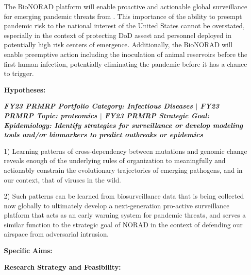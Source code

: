 \documentclass[onecolumn, compsoc,12pt]{IEEEtran}
\begin{document}
The BioNORAD platform will enable proactive and actionable global surveillance for emerging pandemic threats from \infl. This importance of the ability to preempt pandemic risk to the national interest of the United States cannot be overstated, especially in the context of protecting  DoD assest and personnel deployed in potentially high risk centers of emergence. Additionally, the BioNORAD will enable preemptive action including the inoculation of  animal reservoirs before the first human infection, potentially eliminating the pandemic before it has a chance to  trigger.

\textbf{Hypotheses:} %

{\bf \itshape FY23 PRMRP Portfolio Category: Infectious Diseases $\vert$ FY23 PRMRP Topic: proteomics $\vert$  FY23 PRMRP Strategic Goal: Epidemiology: Identify strategies for surveillance or develop modeling tools and/or biomarkers to predict outbreaks or epidemics}

1) Learning patterns of cross-dependency between mutations and genomic change reveals enough of the underlying rules of organization to meaningfully and actionably constrain the evolutionary trajectories of emerging pathogens, and in our context, that of \infl viruses in the wild.

2) Such patterns can be learned from biosurveillance data that is being collected now globally to ultimately develop a next-generation pro-active surveillance platform that acts as an early warning system for pandemic threats, and serves a similar function to the strategic goal of NORAD in the context of defending our airspace from adversarial intrusion.

\textbf{Specific Aims:} %



\textbf{Research Strategy and Feasibility:} %
\end{document}
